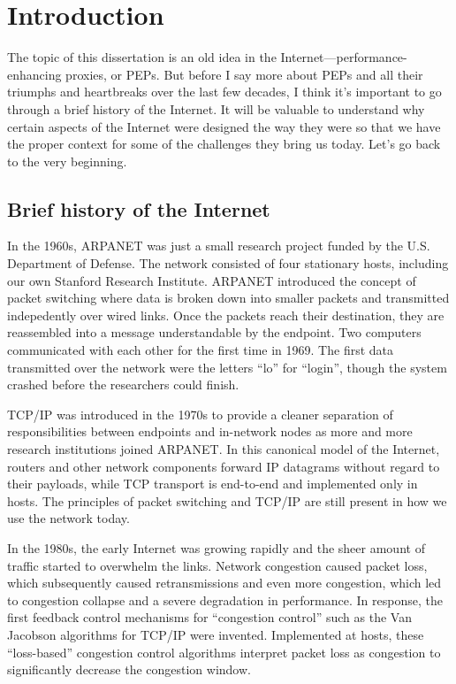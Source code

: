 \chapter{Introduction}
\label{sec:introduction}

The topic of this dissertation is an old idea in the
Internet---performance-enhancing proxies, or PEPs. But before I say more about
PEPs and all their triumphs and heartbreaks over the last few decades, I think
it's important to go through a brief history of the Internet. It will be
valuable to understand why certain aspects of the Internet were designed the
way they were so that we have the proper context for some of the challenges
they bring us today. Let's go back to the very beginning.

\section{Brief history of the Internet}

In the 1960s, ARPANET was just a small research project funded by the U.S.
Department of Defense. The network consisted of four stationary hosts,
including our own Stanford Research Institute. ARPANET introduced the concept
of packet switching where data is broken down into smaller packets and
transmitted indepedently over wired links. Once the packets reach their
destination, they are reassembled into a message understandable by the
endpoint. Two computers communicated with each other for the first time in
1969. The first data transmitted over the network were the letters ``lo'' for
``login'', though the system crashed before the researchers could finish.

TCP/IP was introduced in the 1970s to provide a cleaner separation of
responsibilities between endpoints and in-network nodes as more and more
research institutions joined ARPANET. In this canonical model of the Internet,
routers and other network components forward IP datagrams without regard to
their payloads, while TCP transport is end-to-end and implemented only in
hosts. The principles of packet switching and TCP/IP are still present in how
we use the network today.

In the 1980s, the early Internet was growing rapidly and the sheer amount of
traffic started to overwhelm the links. Network congestion caused packet loss,
which subsequently caused retransmissions and even more congestion, which led
to congestion collapse and a severe degradation in performance. In response,
the first feedback control mechanisms for ``congestion control'' such as the
Van Jacobson algorithms for TCP/IP were invented. Implemented at hosts, these
``loss-based'' congestion control algorithms interpret packet loss as
congestion to significantly decrease the congestion window.

